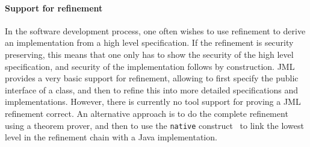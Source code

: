 \paragraph{Support for refinement}

In the software development process, one often wishes to use
refinement to derive an implementation from a high level
specification. If the refinement is security preserving, this means
that one only has to show the security of the high level
specification, and security of the implementation follows by
construction. JML provides a very basic support for refinement,
allowing to first specify the public interface of a class, and then to
refine this into more detailed specifications and
implementations. However, there is currently no tool support for
proving a JML refinement correct. An alternative approach is to do the
complete refinement using a theorem prover, and then to use the
\texttt{native} construct~\cite{Charles06} to link the lowest level in
the refinement chain with a Java implementation.
